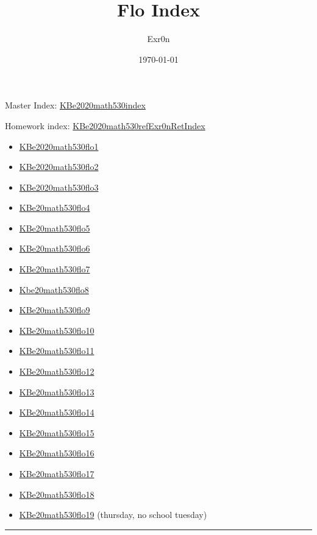 \documentclass[letterpaper]{article}
\author{Exr0n}
\date{\today}
\title{Flo Index}
\renewcommand\maketitle{}
\begin{document}
\maketitle
Master Index: \href{KBe2020math530index.org}{KBe2020math530index}

Homework index:
\href{KBe2020math530refExr0nRetIndex.org}{KBe2020math530refExr0nRetIndex}

\begin{itemize}
\item \href{KBe2020math530flo1.org}{KBe2020math530flo1}
\item \href{KBe2020math530flo2.org}{KBe2020math530flo2}
\item \href{KBe2020math530flo3.org}{KBe2020math530flo3}
\item \href{KBe20math530flo4.org}{KBe20math530flo4}
\item \href{KBe20math530flo5.org}{KBe20math530flo5}
\item \href{KBe20math530flo6.org}{KBe20math530flo6}
\item \href{KBe20math530flo7.org}{KBe20math530flo7}
\item \href{Kbe20math530flo8.org}{Kbe20math530flo8}
\item \href{KBe20math530flo9.org}{KBe20math530flo9}
\item \href{KBe20math530flo10.org}{KBe20math530flo10}
\item \href{KBe20math530flo11.org}{KBe20math530flo11}
\item \href{KBe20math530flo12.org}{KBe20math530flo12}
\item \href{KBe20math530flo13.org}{KBe20math530flo13}
\item \href{KBe20math530flo14.org}{KBe20math530flo14}
\item \href{KBe20math530flo15.org}{KBe20math530flo15}
\item \href{KBe20math530flo16.org}{KBe20math530flo16}
\item \href{KBe20math530flo17.org}{KBe20math530flo17}
\item \href{KBe20math530flo18.org}{KBe20math530flo18}
\item \href{KBe20math530flo19.org}{KBe20math530flo19} (thursday, no school
tuesday)
\end{itemize}

\noindent\rule{\textwidth}{0.5pt}
\end{document}
